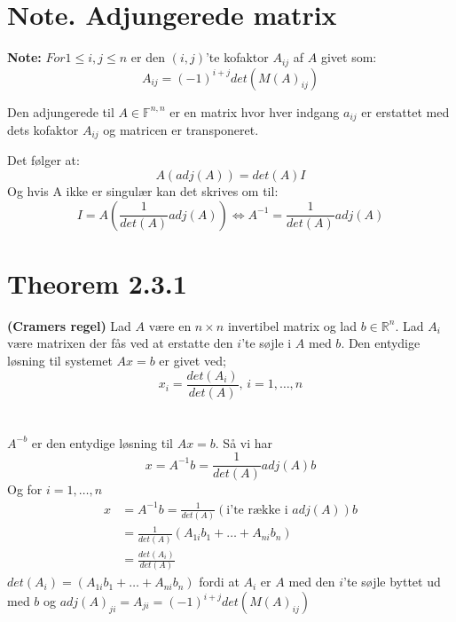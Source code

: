 \documentclass[a4paper,oneside,article]{memoir}
\begin{document}
	\section{Note. Adjungerede matrix}
	\textbf{Note:} $For 1\leq i, j\leq n$ er den $(i,j)$'te
	kofaktor $A_{ij}$ af $A$ givet som:
	$$A_{ij}=(-1)^{i+j}det(M(A)_{ij})$$
	
	Den adjungerede til $A \in \mathbb{F}^{n,n}$ er en 
	matrix hvor hver indgang $a_{ij}$ er erstattet med 
	dets kofaktor $A_{ij}$ og matricen er transponeret.
	
	Det følger at:
	$$A(adj(A))=det(A)I$$
	Og hvis A ikke er singulær kan det skrives om til:
	$$I=A(\frac{1}{det(A)}adj(A)) \Leftrightarrow A^{-1}
	=\frac{1}{det(A)}adj(A)$$
    
    \section{Theorem 2.3.1}
    \textbf{(Cramers regel)} Lad $A$ være en $n \times n$ 
    invertibel matrix og lad $b\in \mathbb{R}^n$. Lad
    $A_i$ være matrixen der fås ved at erstatte den $i$'te
    søjle i $A$ med $b$. Den entydige løsning til systemet
    $Ax=b$ er givet ved;
    $$x_i=\frac{det(A_i)}{det(A)},\, i=1,\dots,n$$
    \\
    \\
    $A^{-b}$ er den entydige løsning til $Ax=b$. Så vi har
    $$x=A^{-1}b=\frac{1}{det(A)}adj(A)b$$
    Og for $i=1,\dots,n$
    \begin{align*}
    x&=A^{-1}b=\frac{1}{det(A)}(\text{i'te række i }adj(A))b\\
    &=\frac{1}{det(A)}(A_{1i}b_1+\dots+A_{ni}b_n)\\
    &=\frac{det(A_i)}{det(A)}
    \end{align*}
    $det(A_i)=(A_{1i}b_1+\dots+A_{ni}b_n)$ fordi at $A_i$
    er $A$ med den $i$'te søjle byttet ud med $b$ og
    $adj(A)_{ji}=A_{ji}=(-1)^{i+j}det(M(A)_{ij})$
    
\end{document}
